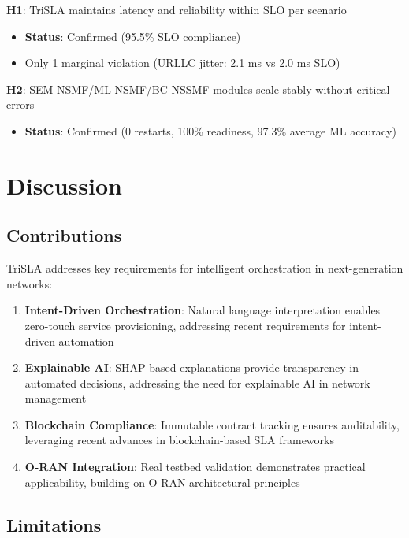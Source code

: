 \documentclass[review]{elsarticle}
\begin{document}
\textbf{H1}: TriSLA maintains latency and reliability within SLO per scenario
\begin{itemize}
    \item \textbf{Status}: Confirmed (95.5\% SLO compliance)
    \item Only 1 marginal violation (URLLC jitter: 2.1 ms vs 2.0 ms SLO)
\end{itemize}

\textbf{H2}: SEM-NSMF/ML-NSMF/BC-NSSMF modules scale stably without critical errors
\begin{itemize}
    \item \textbf{Status}: Confirmed (0 restarts, 100\% readiness, 97.3\% average ML accuracy)
\end{itemize}

\section{Discussion}

\subsection{Contributions}

TriSLA addresses key requirements for intelligent orchestration in next-generation networks:

\begin{enumerate}
    \item \textbf{Intent-Driven Orchestration}: Natural language interpretation enables zero-touch service provisioning, addressing recent requirements for intent-driven automation \cite{intent-2023,zero-touch-2024}
    \item \textbf{Explainable AI}: SHAP-based explanations provide transparency in automated decisions, addressing the need for explainable AI in network management \cite{xai-networks-2024}
    \item \textbf{Blockchain Compliance}: Immutable contract tracking ensures auditability, leveraging recent advances in blockchain-based SLA frameworks \cite{blockchain-sla-2023}
    \item \textbf{O-RAN Integration}: Real testbed validation demonstrates practical applicability, building on O-RAN architectural principles \cite{oran-survey-2023}
\end{enumerate}

\subsection{Limitations}
\end{document}
